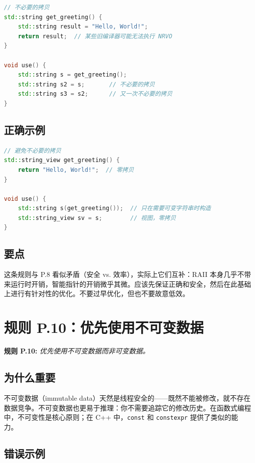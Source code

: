 \begin{lstlisting}[language=C++]
// 不必要的拷贝
std::string get_greeting() {
    std::string result = "Hello, World!";
    return result;  // 某些旧编译器可能无法执行 NRVO
}

void use() {
    std::string s = get_greeting();
    std::string s2 = s;       // 不必要的拷贝
    std::string s3 = s2;      // 又一次不必要的拷贝
}
\end{lstlisting}

\subsection{正确示例}

\begin{lstlisting}[language=C++]
// 避免不必要的拷贝
std::string_view get_greeting() {
    return "Hello, World!";  // 零拷贝
}

void use() {
    std::string s(get_greeting());  // 只在需要可变字符串时构造
    std::string_view sv = s;        // 视图，零拷贝
}
\end{lstlisting}

\subsection{要点}
这条规则与 P.8 看似矛盾（安全 vs. 效率），实际上它们互补：RAII 本身几乎不带来运行时开销，智能指针的开销微乎其微。应该先保证正确和安全，然后在此基础上进行有针对性的优化。不要过早优化，但也不要故意低效。

\section{规则 P.10：优先使用不可变数据}

\textbf{规则 P.10:} \textit{优先使用不可变数据而非可变数据。}

\subsection{为什么重要}

不可变数据（immutable data）天然是线程安全的——既然不能被修改，就不存在数据竞争。不可变数据也更易于推理：你不需要追踪它的修改历史。在函数式编程中，不可变性是核心原则；在 C++ 中，\texttt{const} 和 \texttt{constexpr} 提供了类似的能力。

\subsection{错误示例}

